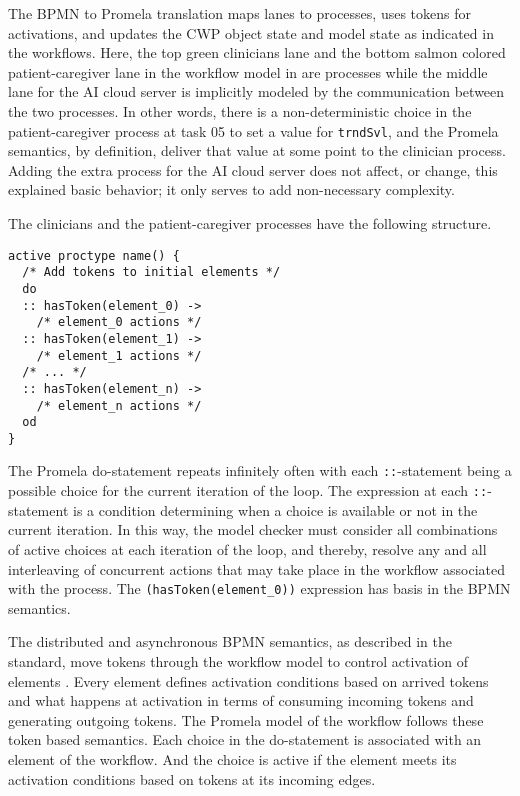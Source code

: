 The BPMN to Promela translation maps lanes to processes, uses tokens for activations, and updates the CWP object state and model state as indicated in the workflows.
Here, the top green clinicians lane and the bottom salmon colored patient-caregiver lane in the workflow model in  are processes while the middle lane for the AI cloud server is implicitly modeled by the communication between the two processes. In other words, there is a non-deterministic choice in the patient-caregiver process at task 05 to set a value for \texttt{trndSvl}, and the Promela semantics, by definition, deliver that value at some point to the clinician process. Adding the extra process for the AI cloud server does not affect, or change, this explained basic behavior; it only serves to add non-necessary complexity.

The clinicians and the patient-caregiver processes have the following structure.
%
{\small
\begin{lstlisting}[style=myPromela]
active proctype name() {
  /* Add tokens to initial elements */
  do
  :: hasToken(element_0) ->
    /* element_0 actions */
  :: hasToken(element_1) ->
    /* element_1 actions */
  /* ... */  
  :: hasToken(element_n) ->
    /* element_n actions */
  od
}
\end{lstlisting}
}
%
\noindent The Promela do-statement repeats infinitely often with each \texttt{::}-statement being a possible choice for the current iteration of the loop. The expression at each \texttt{::}-statement is a condition determining when a choice is available or not in the current iteration. In this way, the model checker must consider all combinations of active choices at each iteration of the loop, and thereby, resolve any and all interleaving of concurrent actions that may take place in the workflow associated with the process. The \texttt{(hasToken(element\_0))} expression has basis in the BPMN semantics.

The distributed and asynchronous BPMN semantics, as described in the standard, move tokens through the workflow model to control activation of elements \cite{BPMNSpecification}. Every element defines activation conditions based on arrived tokens and what happens at activation in terms of consuming incoming tokens and generating outgoing tokens. The Promela model of the workflow follows these token based semantics. Each choice in the do-statement is associated with an element of the workflow. And the choice is active if the element meets its activation conditions based on tokens at its incoming edges.

